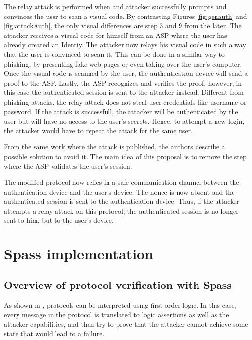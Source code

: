\documentclass{article}
\begin{document}
	

	The relay attack is performed when and attacker successfully prompts and
	convinces the user to scan a visual code. By contrasting Figures \ref{fig:genauth} 
	and \ref{fig:attackAuth}, the only visual differences are step 3 and
	9 from the later. The attacker receives a visual code for himself from
	an ASP where the user has already created an Identiy. The attacker now
	relays his visual code in such a way that the user is convinced to scan it.
	This can be done in a similar way to phishing, by presenting fake web
	pages or even taking over the user's computer. Once the visual code is
	scanned by the user, the authentication device will send a proof to the ASP.
	Lastly, the ASP recognizes and verifies the proof, however, in this case
	the authenticated session is sent to the attacker instead. Different from
	phishing attacks, the relay attack does not steal user credentials like
	username or password. If the attack is successfull, the attacker will be
	authenticated by the user but will have no access to the user's secrets. 
	Hence, to attempt a new login, the attacker would have to repeat the attack
	for the same user.

	From the same work where the attack is published, the authors describe
	a possible solution to avoid it. The main idea of this proposal is to
	remove the step where the ASP validates the user's session.

	
	
	The modified protocol now relies in a safe communication channel between
	the authentication device and the user's device. The nonce is now absent
	and the authenticated session is sent to the authentication device. Thus,
	if the attacker attempts a relay attack on this protocol, the authenticated
	session is no longer sent to him, but to the user's device.

\section{Spass implementation}
\subsection{Overview of protocol verification with Spass}
	As shown in , 
	protocols can be interpreted using first-order logic. In this case, every message in the protocol
	is translated to logic assertions as well as the attacker capabilities, and then try to prove that the
	attacker cannot achieve some state that would lead to a failure.
\end{document}
